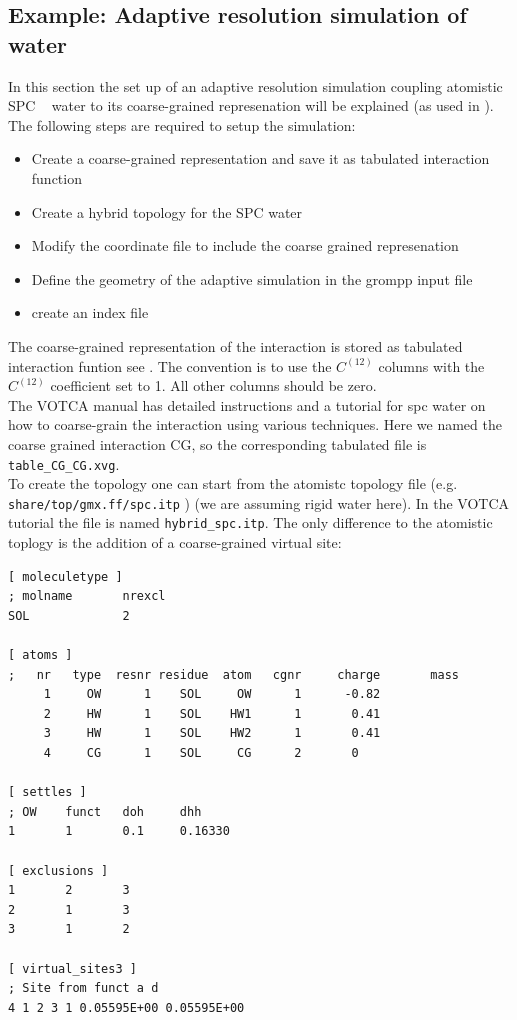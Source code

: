 \subsection{Example: Adaptive resolution simulation of water}\label{subsec:adressexample}
In this section the set up of  an adaptive resolution simulation coupling atomistic SPC ~\cite{Berendsen81} water to its coarse-grained represenation will be explained (as used in \cite{fritschpoblete2012}).
The following steps are required to setup the simulation:
\begin{itemize}
\item Create a coarse-grained representation and save it as tabulated interaction function 
\item Create a hybrid topology for the SPC water
\item Modify the coordinate file to include the coarse grained represenation
\item Define the geometry of the adaptive simulation in the grompp input file
\item create an index file
\end{itemize}
The coarse-grained representation of the interaction is stored as tabulated interaction funtion see . The convention is to use the $C^{(12)}$  columns with the  $C^{(12)}$ coefficient set to 1. All other columns should be zero.\\
The VOTCA manual has detailed instructions and a tutorial for spc water on how to coarse-grain the interaction using various techniques. 
Here we named the coarse grained interaction CG, so the corresponding tabulated file is {\tt table_CG_CG.xvg}.\\
To create the topology one can start from the atomistc topology file (e.g. {\tt share/top/gmx.ff/spc.itp} ) (we are assuming rigid water here). In the VOTCA tutorial the file is named {\tt hybrid_spc.itp}.
The only difference to the atomistic toplogy is the addition of a coarse-grained virtual site:
{\small
\begin{verbatim}
[ moleculetype ]
; molname       nrexcl
SOL             2

[ atoms ]
;   nr   type  resnr residue  atom   cgnr     charge       mass
     1     OW      1    SOL     OW      1      -0.82
     2     HW      1    SOL    HW1      1       0.41
     3     HW      1    SOL    HW2      1       0.41
     4     CG      1    SOL     CG      2       0

[ settles ]
; OW    funct   doh     dhh
1       1       0.1     0.16330

[ exclusions ]
1       2       3
2       1       3
3       1       2

[ virtual_sites3 ]
; Site from funct a d
4 1 2 3 1 0.05595E+00 0.05595E+00
\end{verbatim}}
